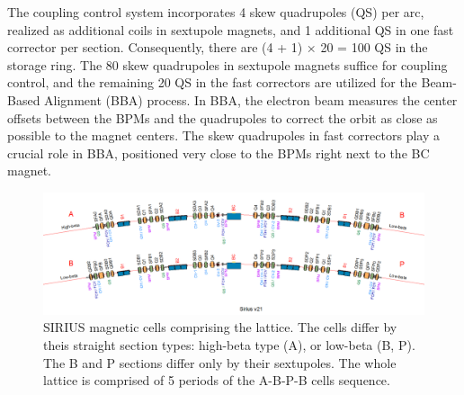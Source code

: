 The coupling control system incorporates 4 skew quadrupoles (QS) per arc, realized as additional coils in sextupole magnets, and 1 additional QS in one fast corrector per section. Consequently, there are (4 + 1) × 20 = 100 QS in the storage ring. The 80 skew quadrupoles in sextupole magnets suffice for coupling control, and the remaining 20 QS in the fast correctors are utilized for the Beam-Based Alignment (BBA) process. In BBA, the electron beam measures the center offsets between the BPMs and the quadrupoles to correct the orbit as close as possible to the magnet centers. The skew quadrupoles in fast correctors play a crucial role in BBA, positioned very close to the BPMs right next to the BC magnet.

\begin{figure}
    \includegraphics[width=\textwidth]{Images/sirius_arcs.png}
    \caption{SIRIUS magnetic cells comprising the lattice. The cells differ by theis straight section types: high-beta type (A), or low-beta (B, P). The B and P sections differ only by their sextupoles. The whole lattice is comprised of 5 periods of the A-B-P-B cells sequence.}
\end{figure}

